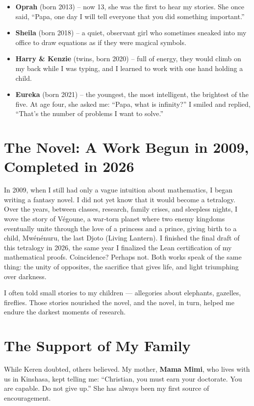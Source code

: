 \documentclass[11pt,a4paper]{article}
\begin{document}
\begin{itemize}
\item \textbf{Oprah} (born 2013) – now 13, she was the first to hear my stories. She once said, ``Papa, one day I will tell everyone that you did something important.''
\item \textbf{Sheila} (born 2018) – a quiet, observant girl who sometimes sneaked into my office to draw equations as if they were magical symbols.
\item \textbf{Harry \& Kenzie} (twins, born 2020) – full of energy, they would climb on my back while I was typing, and I learned to work with one hand holding a child.
\item \textbf{Eureka} (born 2021) – the youngest, the most intelligent, the brightest of the five. At age four, she asked me: ``Papa, what is infinity?'' I smiled and replied, ``That's the number of problems I want to solve.''
\end{itemize}

\section{The Novel: A Work Begun in 2009, Completed in 2026}

In 2009, when I still had only a vague intuition about mathematics, I began writing a fantasy novel. I did not yet know that it would become a tetralogy. Over the years, between classes, research, family crises, and sleepless nights, I wove the story of Végoune, a war‑torn planet where two enemy kingdoms eventually unite through the love of a princess and a prince, giving birth to a child, Mwénénuru, the last Djoto (Living Lantern). I finished the final draft of this tetralogy in 2026, the same year I finalized the Lean certification of my mathematical proofs. Coincidence? Perhaps not. Both works speak of the same thing: the unity of opposites, the sacrifice that gives life, and light triumphing over darkness.

I often told small stories to my children — allegories about elephants, gazelles, fireflies. Those stories nourished the novel, and the novel, in turn, helped me endure the darkest moments of research.

\section{The Support of My Family}

While Keren doubted, others believed. My mother, \textbf{Mama Mimi}, who lives with us in Kinshasa, kept telling me: ``Christian, you must earn your doctorate. You are capable. Do not give up.'' She has always been my first source of encouragement.
\end{document}
